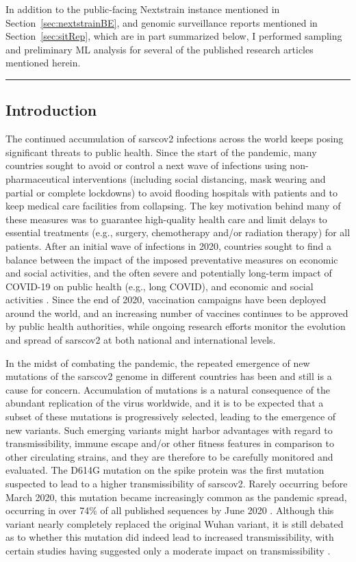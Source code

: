In addition to the public-facing Nextstrain instance mentioned in Section~\ref{sec:nextstrainBE}, and genomic surveillance reports mentioned in Section~\ref{sec:sitRep}, which are in part summarized below, I performed sampling and preliminary ML analysis for several of the published research articles mentioned herein.
\vspace*{12pt}
\hrule
\onehalfspacing

\subsection{Introduction}
The continued accumulation of \gls{sarscov2} infections across the world keeps posing significant threats to public health.
Since the start of the pandemic, many countries sought to avoid or control a next wave of infections using non-pharmaceutical interventions (including social distancing, mask wearing and partial or complete lockdowns) to avoid flooding hospitals with patients and to keep medical care facilities from collapsing.
The key motivation behind many of these measures was to guarantee high-quality health care and limit delays to essential treatments (e.g., surgery, chemotherapy and/or radiation therapy) for all patients.
After an initial wave of infections in 2020, countries sought to find a balance between the impact of the imposed preventative measures on economic and social activities, and the often severe and potentially long-term impact of COVID-19 on public health (e.g., long COVID), and economic and social activities \citep{zivin2020spread}.
Since the end of 2020, vaccination campaigns have been deployed around the world, and an increasing number of vaccines continues to be approved by public health authorities, while ongoing research efforts monitor the evolution and spread of \gls{sarscov2} at both national and international levels.

In the midst of combating the pandemic, the repeated emergence of new mutations of the \gls{sarscov2} genome in different countries has been and still is a cause for concern.
Accumulation of mutations is a natural consequence of the abundant replication of the virus worldwide, and it is to be expected that a subset of these mutations is progressively selected, leading to the emergence of new variants.
Such emerging variants might harbor advantages with regard to transmissibility, immune escape and/or other fitness features in comparison to other circulating strains, and they are therefore to be carefully monitored and evaluated.
The D614G mutation on the spike protein was the first mutation suspected to lead to a higher transmissibility of \gls{sarscov2}.
Rarely occurring before March 2020, this mutation became increasingly common as the pandemic spread, occurring in over 74\% of all published sequences by June 2020 \citep{korber2020tracking,plante2021spike}.
Although this variant nearly completely replaced the original Wuhan variant, it is still debated as to whether this mutation did indeed lead to increased transmissibility, with certain studies having suggested only a moderate impact on transmissibility \citep{cogUKreport1,volz2021evaluating}.

